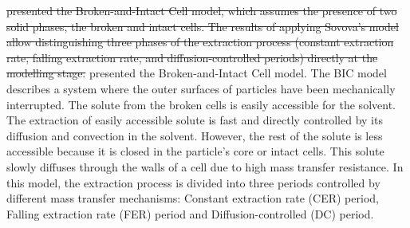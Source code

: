 \documentclass[../Article_Model_Parameters.tex]{subfiles}
\begin{document}
	\citet{Sovova1994} \sout{presented the Broken-and-Intact Cell model, which assumes the presence of two solid phases, the broken and intact cells. The results of applying Sovova's model allow distinguishing three phases of the extraction process (constant extraction rate, falling extraction rate, and diffusion-controlled periods) directly at the modelling stage.}
	{\color{blue} presented the Broken-and-Intact Cell model. The BIC model describes a system where the outer surfaces of particles have been mechanically interrupted. The solute from the broken cells is easily accessible for the solvent. The extraction of easily accessible solute is fast and directly controlled by its diffusion and convection in the solvent.
		However, the rest of the solute is less accessible because it is closed in the particle's core or intact cells. This solute slowly diffuses through the walls of a cell due to high mass transfer resistance.
		In this model, the extraction process is divided into three periods controlled by different mass transfer mechanisms: Constant extraction rate (CER) period, Falling extraction rate (FER) period and Diffusion-controlled (DC) period.}
	
\end{document}
